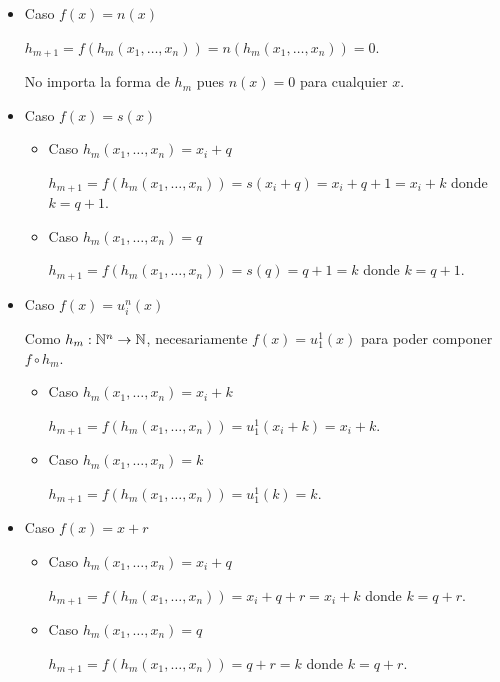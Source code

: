 \begin{itemize}
    \item Caso $f(x) = n(x)$

    $h_{m+1} = f(h_m(x_1, \dots, x_n)) = n(h_m(x_1, \dots, x_n)) = 0$.

    No importa la forma de $h_m$ pues $n(x) = 0$ para cualquier $x$.

    \item Caso $f(x) = s(x)$

    \begin{itemize}
        \item Caso $h_m(x_1, \dots, x_n) = x_i + q$

        $h_{m+1} = f(h_m(x_1, \dots, x_n)) = s(x_i + q) = x_i + q + 1 = x_i + k$ donde $k = q + 1$.

        \item Caso $h_m(x_1, \dots, x_n) = q$

        $h_{m+1} = f(h_m(x_1, \dots, x_n)) = s(q) = q + 1 = k$ donde $k = q + 1$.
    \end{itemize}

    \item Caso $f(x) = u^n_i(x)$

    Como $h_m: \mathbb{N}^n \to \mathbb{N}$, necesariamente $f(x) = u^1_1(x)$ para poder componer $f \circ h_m$.

    \begin{itemize}
        \item Caso $h_m(x_1, \dots, x_n) = x_i + k$

        $h_{m+1} = f(h_m(x_1, \dots, x_n)) = u^1_1(x_i + k) = x_i + k$.

        \item Caso $h_m(x_1, \dots, x_n) = k$

        $h_{m+1} = f(h_m(x_1, \dots, x_n)) = u^1_1(k) = k$.
    \end{itemize}

    \item Caso $f(x) = x + r$

    \begin{itemize}
        \item Caso $h_m(x_1, \dots, x_n) = x_i + q$

        $h_{m+1} = f(h_m(x_1, \dots, x_n)) = x_i + q + r = x_i + k$ donde $k = q + r$.

        \item Caso $h_m(x_1, \dots, x_n) = q$

        $h_{m+1} = f(h_m(x_1, \dots, x_n)) = q + r = k$ donde $k = q + r$.
    \end{itemize}


\end{itemize}
